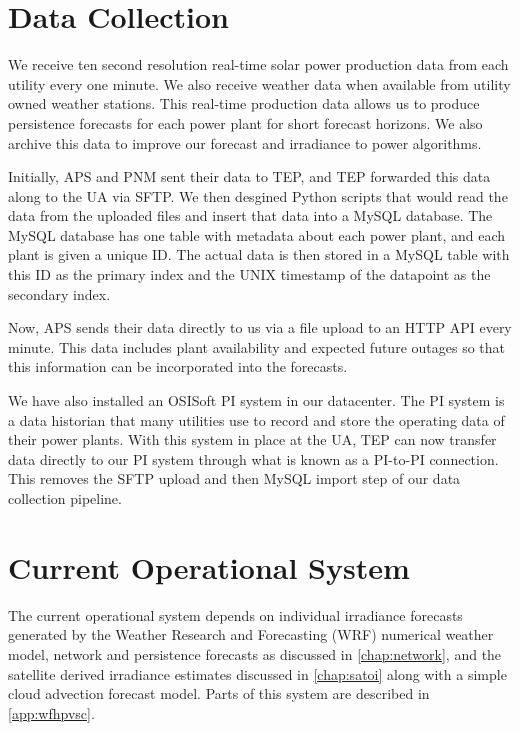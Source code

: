\section{Data Collection}
\label{sec:datacollection}

We receive ten second resolution real-time solar power production data
from each utility every one minute.
We also receive weather data when available from utility owned weather
stations.
This real-time production data allows us to produce persistence
forecasts for each power plant for short forecast horizons.
We also archive this data to improve our forecast and irradiance to
power algorithms.

Initially, APS and PNM sent their data to TEP, and TEP forwarded this
data along to the UA via SFTP.
We then desgined Python scripts that would read the data from the
uploaded files and insert that data into a MySQL database.
The MySQL database has one table with metadata about each power plant,
and each plant is given a unique ID.
The actual data is then stored in a MySQL table with this ID as the
primary index and the UNIX timestamp of the datapoint as the secondary
index.

Now, APS sends their data directly to us via a file upload to an HTTP
API every minute.
This data includes plant availability and expected future outages so
that this information can be incorporated into the forecasts.

We have also installed an OSISoft PI system in our datacenter.
The PI system is a data historian that many utilities use to record
and store the operating data of their power plants.
With this system in place at the UA, TEP can now transfer data
directly to our PI system through what is known as a PI-to-PI
connection.
This removes the SFTP upload and then MySQL import step of our data
collection pipeline.

\section{Current Operational System}
\label{sec:opsys}

The current operational system depends on individual irradiance forecasts
generated by the Weather Research and Forecasting (WRF) numerical
weather model, network and persistence forecasts as discussed in
\cref{chap:network}, and the satellite derived irradiance estimates
discussed in \cref{chap:satoi} along with a simple cloud advection
forecast model.
Parts of this system are described in \cref{app:wfhpvsc}.

